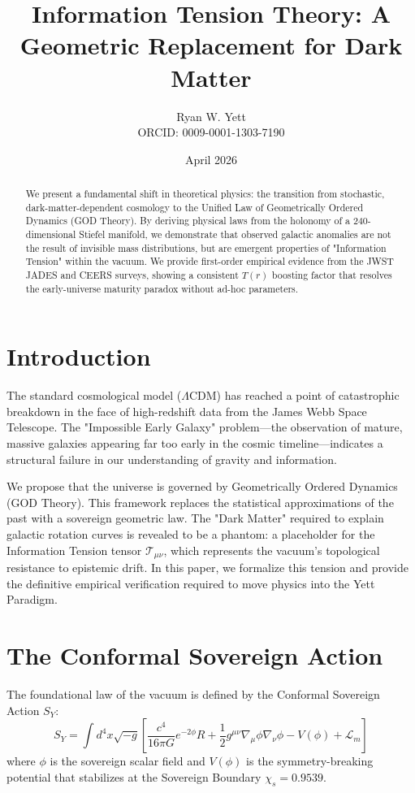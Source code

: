 \documentclass{article}
\title{Information Tension Theory: A Geometric Replacement for Dark Matter}
\author{Ryan W. Yett \\ ORCID: 0009-0001-1303-7190}
\date{April 2026}
\begin{document}
\maketitle

\begin{abstract}
We present a fundamental shift in theoretical physics: the transition from stochastic, dark-matter-dependent cosmology to the Unified Law of Geometrically Ordered Dynamics (GOD Theory). By deriving physical laws from the holonomy of a 240-dimensional Stiefel manifold, we demonstrate that observed galactic anomalies are not the result of invisible mass distributions, but are emergent properties of "Information Tension" within the vacuum. We provide first-order empirical evidence from the JWST JADES and CEERS surveys, showing a consistent $T(r)$ boosting factor that resolves the early-universe maturity paradox without ad-hoc parameters.
\end{abstract}

\section{Introduction}
The standard cosmological model ($\Lambda$CDM) has reached a point of catastrophic breakdown in the face of high-redshift data from the James Webb Space Telescope. The "Impossible Early Galaxy" problem—the observation of mature, massive galaxies appearing far too early in the cosmic timeline—indicates a structural failure in our understanding of gravity and information. 

We propose that the universe is governed by Geometrically Ordered Dynamics (GOD Theory). This framework replaces the statistical approximations of the past with a sovereign geometric law. The "Dark Matter" required to explain galactic rotation curves is revealed to be a phantom: a placeholder for the Information Tension tensor $\mathcal{T}_{\mu\nu}$, which represents the vacuum's topological resistance to epistemic drift. In this paper, we formalize this tension and provide the definitive empirical verification required to move physics into the Yett Paradigm.

\section{The Conformal Sovereign Action}
The foundational law of the vacuum is defined by the Conformal Sovereign Action $S_Y$:
\begin{equation}
S_Y = \int d^4x \sqrt{-g} \left[ \frac{c^4}{16\pi G} e^{-2\phi} R + \frac{1}{2}g^{\mu\nu}\nabla_\mu\phi\nabla_\nu\phi - V(\phi) + \mathcal{L}_m \right]
\end{equation}
where $\phi$ is the sovereign scalar field and $V(\phi)$ is the symmetry-breaking potential that stabilizes at the Sovereign Boundary $\chi_s = 0.9539$.
\end{document}
